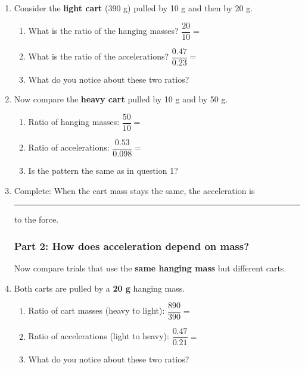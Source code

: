 \documentclass[12pt, twoside]{article}
\begin{document}
\begin{enumerate}[itemsep=0.25cm]

\item Consider the \textbf{light cart} (390 g) pulled by 10 g and then by 20 g.
  \begin{enumerate}[itemsep=0.5cm]
    \item What is the ratio of the hanging masses? \quad $\dfrac{20}{10} = $
    \item What is the ratio of the accelerations? \quad $\dfrac{0.47}{0.23} = $
    \item What do you notice about these two ratios?
  \end{enumerate}
  \vspace{0.5cm}

\item Now compare the \textbf{heavy cart} pulled by 10 g and by 50 g.
  \begin{enumerate}[itemsep=0.5cm]
    \item Ratio of hanging masses: \quad $\dfrac{50}{10} = $
    \item Ratio of accelerations: \quad $\dfrac{0.53}{0.098} = $
    \item Is the pattern the same as in question 1?
  \end{enumerate}
  \vspace{0.5cm}

\item Complete: When the cart mass stays the same, the acceleration is \rule{5cm}{0.4pt} to the force.

\newpage
\subsubsection*{Part 2: How does acceleration depend on mass?}

Now compare trials that use the \textbf{same hanging mass} but different carts.

\item Both carts are pulled by a \textbf{20 g} hanging mass.
  \begin{enumerate}[itemsep=0.5cm]
    \item Ratio of cart masses (heavy to light): \quad $\dfrac{890}{390} = $
    \item Ratio of accelerations (light to heavy): \quad $\dfrac{0.47}{0.21} = $
    \item What do you notice about these two ratios?
  \end{enumerate}
  \vspace{0.5cm}


\end{enumerate}
\end{document}
